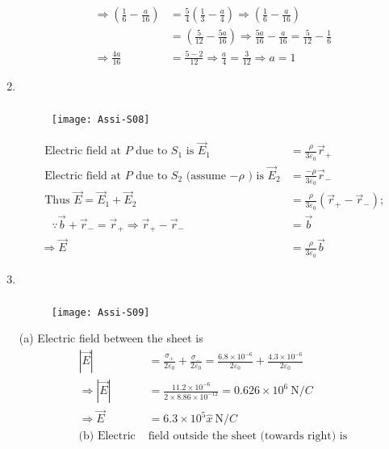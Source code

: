 \begin{enumerate}
\begin{answer}
\begin{align*}
	\Rightarrow\left(\frac{1}{6}-\frac{a}{16}\right)&=\frac{5}{4}\left(\frac{1}{3}-\frac{a}{4}\right) \Rightarrow\left(\frac{1}{6}-\frac{a}{16}\right)\\&=\left(\frac{5}{12}-\frac{5 a}{16}\right) \Rightarrow \frac{5 a}{16}-\frac{a}{16}=\frac{5}{12}-\frac{1}{6}\\
	\Rightarrow \frac{4 a}{16}&=\frac{5-2}{12} \Rightarrow \frac{a}{4}=\frac{3}{12} \Rightarrow a=1
	\end{align*}
\end{answer}
\item $\left. \right. $
\begin{answer}$\left. \right. $
		\begin{figure}[H]
		\centering
		\texttt{[image: Assi-S08]}
	\end{figure}
	\begin{align*}
	\text{ Electric field at $P$ due to $S_{1}$ is }\vec{E}_{1}&=\frac{\rho}{3 \varepsilon_{0}} \vec{r}_{+}\\
\text{	Electric field at $P$ due to $S_{2}$ (assume $-\rho$ ) is }\vec{E}_{2}&=\frac{-\rho}{3 \varepsilon_{0}} \vec{r}_{-}\\
\text{	Thus }\vec{E}=\vec{E}_{1}+\vec{E}_{2}&=\frac{\rho}{3 \varepsilon_{0}}\left(\vec{r}_{+}-\vec{r}_{-}\right) ; \\
\quad \because \vec{b}+\vec{r}_{-}=\vec{r}_{+} \Rightarrow \vec{r}_{+}-\vec{r}_{-}&=\vec{b}\\
\Rightarrow \vec{E}&=\frac{\rho}{3 \varepsilon_{0}} \vec{b}
	\end{align*}
\end{answer}
\item $\left. \right. $
\begin{answer}$\left. \right. $
		\begin{figure}[H]
		\centering
		\texttt{[image: Assi-S09]}
	\end{figure}
	(a) Electric field between the sheet is
	\begin{align*}
	|\vec{E}|&=\frac{\sigma_{+}}{2 \varepsilon_{0}}+\frac{\sigma_{-}}{2 \varepsilon_{0}}=\frac{6.8 \times 10^{-6}}{2 \varepsilon_{0}}+\frac{4.3 \times 10^{-6}}{2 \varepsilon_{0}} \\
	\Rightarrow|\vec{E}|&=\frac{11.2 \times 10^{-6}}{2 \times 8.86 \times 10^{-12}}=0.626 \times 10^{6} \mathrm{~N} / C \\
	\Rightarrow \vec{E}&=6.3 \times 10^{5} \hat{x} \mathrm{~N} / C\\
	\text{(b) Electric }&\text{field outside the sheet (towards right) is}\\

\end{align*}
\end{answer}
\end{enumerate}
